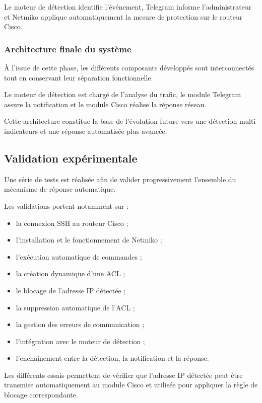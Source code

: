 Le moteur de détection identifie l'événement, Telegram informe l'administrateur et Netmiko applique automatiquement la mesure de protection sur le routeur Cisco.

\subsubsection{Architecture finale du système}

À l'issue de cette phase, les différents composants développés sont interconnectés tout en conservant leur séparation fonctionnelle.

Le moteur de détection est chargé de l'analyse du trafic, le module Telegram assure la notification et le module Cisco réalise la réponse réseau.

Cette architecture constitue la base de l'évolution future vers une détection multi-indicateurs et une réponse automatisée plus avancée.

\subsection{Validation expérimentale}

Une série de tests est réalisée afin de valider progressivement l'ensemble du mécanisme de réponse automatique.

Les validations portent notamment sur :

\begin{itemize}
    \item la connexion SSH au routeur Cisco ;
    \item l'installation et le fonctionnement de Netmiko ;
    \item l'exécution automatique de commandes ;
    \item la création dynamique d'une ACL ;
    \item le blocage de l'adresse IP détectée ;
    \item la suppression automatique de l'ACL ;
    \item la gestion des erreurs de communication ;
    \item l'intégration avec le moteur de détection ;
    \item l'enchaînement entre la détection, la notification et la réponse.
\end{itemize}

Les différents essais permettent de vérifier que l'adresse IP détectée peut être transmise automatiquement au module Cisco et utilisée pour appliquer la règle de blocage correspondante.

